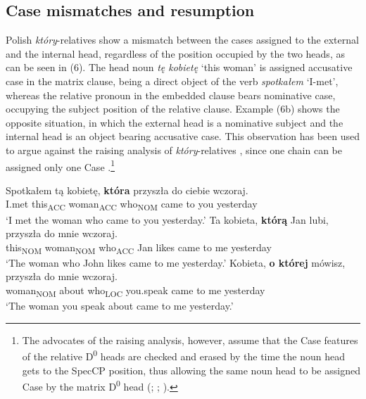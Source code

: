 \documentclass[output=paper]{langsci/langscibook}
\begin{document}
\subsection{Case mismatches and resumption}%

Polish \textit{który}{}-relatives show a mismatch between the cases assigned to the external and the internal head, regardless of the position occupied by the two heads, as can be seen in (6). The head noun \textit{tę kobietę} ‘this woman’ is assigned accusative case in the matrix clause, being a direct object of the verb \textit{spotkałem} ‘I-met’, whereas the relative pronoun in the embedded clause bears nominative case, occupying the subject position of the relative clause. Example (6b) shows the opposite situation, in which the external head is a nominative subject and the internal head is an object bearing accusative case. This observation has been used to argue against the raising analysis of \textit{który}{}-relatives \citep{Borsley1997}, since one chain can be assigned only one Case \citep{Chomsky1982}.\footnote{The advocates of the raising analysis, however, assume that the Case features of the relative D\textsuperscript{0} heads are checked and erased by the time the noun head gets to the SpecCP position, thus allowing the same noun head to be assigned Case by the matrix D\textsuperscript{0} head (\citealt{Kayne1994}; \citealt{Bianchi2000}; \citealt{Citko2004}).}

\ea%
    \label{ex:leska:6}
    \ea
    \gll Spotkałem   tą   kobietę,   \textbf{która}   przyszła  do  ciebie   wczoraj.        \\
          I.met   this\textsubscript{ACC}   woman\textsubscript{ACC}   who\textsubscript{NOM}   came   to  you  yesterday\\
    \glt ‘I met the woman who came to you yesterday.’
    \ex
    \gll Ta     kobieta,   \textbf{którą}   Jan  lubi,  przyszła  do  mnie  wczoraj.  \\
         this\textsubscript{NOM}   woman\textsubscript{NOM}   who\textsubscript{ACC}   Jan likes   came   to  me   yesterday\\
    \glt ‘The woman who John likes came to me yesterday.’
    \ex
    \gll Kobieta,   \textbf{o  której}   mówisz,   przyszła  do  mnie   wczoraj.\\
         woman\textsubscript{NOM}  about   who\textsubscript{LOC}   you.speak   came   to   me   yesterday\\
    \glt ‘The woman you speak about came to me yesterday.’
    \z
\z
\end{document}
